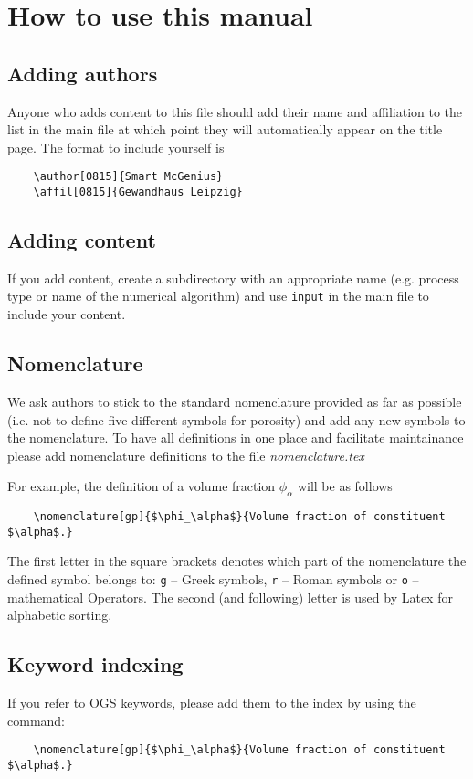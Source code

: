 \chapter{How to use this manual}

\section{Adding authors}
Anyone who adds content to this file should add their name and affiliation to the list in the main file at which point they will automatically appear on the title page. The format to include yourself is 
\begin{verbatim}
	\author[0815]{Smart McGenius}
	\affil[0815]{Gewandhaus Leipzig}
\end{verbatim}

\section{Adding content}
If you add content, create a subdirectory with an appropriate name (e.g. process type or name of the numerical algorithm) and use \texttt{input} in the main file to include your content.

\section{Nomenclature}
We ask authors to stick to the standard nomenclature provided as far as possible (i.e. not to define five different symbols for porosity) and add any new symbols to the nomenclature. To have all definitions in one place and facilitate maintainance please add nomenclature definitions to the file \textit{nomenclature.tex}

For example, the definition of a volume fraction $\phi_\alpha$ will be as follows
\begin{verbatim}
	\nomenclature[gp]{$\phi_\alpha$}{Volume fraction of constituent $\alpha$.}
\end{verbatim}
The first letter in the square brackets denotes which part of the nomenclature the defined symbol belongs to: \texttt{g} -- Greek symbols, \texttt{r} -- Roman symbols or \texttt{o} -- mathematical Operators. The second (and following) letter is used by Latex for alphabetic sorting.

\section{Keyword indexing}
If you refer to OGS keywords, please add them to the index by using the command:
\begin{verbatim}
	\nomenclature[gp]{$\phi_\alpha$}{Volume fraction of constituent $\alpha$.}
\end{verbatim}

